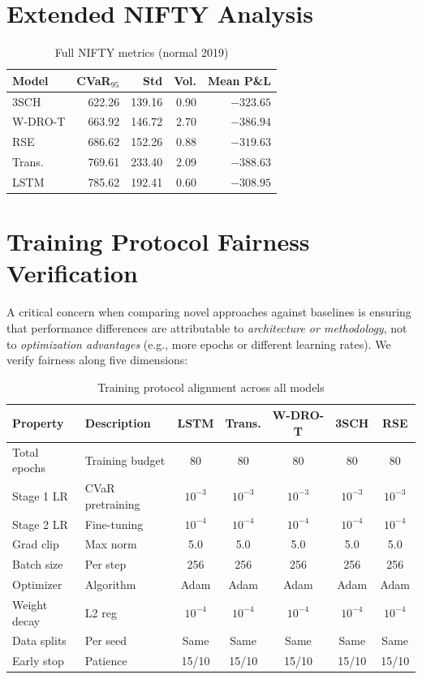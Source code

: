 \documentclass[11pt]{article}
\begin{document}
\section{Extended NIFTY Analysis}
\label{app:nifty}

\begin{table}[h]
\centering
\caption{Full NIFTY metrics (normal 2019)}
\small
\begin{tabular}{lrrrr}
\toprule
\textbf{Model} & \textbf{CVaR$_{95}$} & \textbf{Std} & \textbf{Vol.} & \textbf{Mean P\&L} \\
\midrule
3SCH & 622.26 & 139.16 & 0.90 & $-323.65$ \\
W-DRO-T & 663.92 & 146.72 & 2.70 & $-386.94$ \\
RSE & 686.62 & 152.26 & 0.88 & $-319.63$ \\
Trans. & 769.61 & 233.40 & 2.09 & $-388.63$ \\
LSTM & 785.62 & 192.41 & 0.60 & $-308.95$ \\
\bottomrule
\end{tabular}
\end{table}

\section{Training Protocol Fairness Verification}
\label{app:fairness}

A critical concern when comparing novel approaches against baselines is ensuring that performance differences are attributable to \emph{architecture or methodology}, not to \emph{optimization advantages} (e.g., more epochs or different learning rates).  We verify fairness along five dimensions:

\begin{table}[h]
\centering
\caption{Training protocol alignment across all models}
\small
\begin{tabularx}{\textwidth}{@{}lXccccc@{}}
\toprule
\textbf{Property} & \textbf{Description} & \textbf{LSTM} & \textbf{Trans.} & \textbf{W-DRO-T} & \textbf{3SCH} & \textbf{RSE} \\
\midrule
Total epochs & Training budget & 80 & 80 & 80 & 80 & 80 \\
Stage 1 LR & CVaR pretraining & $10^{-3}$ & $10^{-3}$ & $10^{-3}$ & $10^{-3}$ & $10^{-3}$ \\
Stage 2 LR & Fine-tuning & $10^{-4}$ & $10^{-4}$ & $10^{-4}$ & $10^{-4}$ & $10^{-4}$ \\
Grad clip & Max norm & 5.0 & 5.0 & 5.0 & 5.0 & 5.0 \\
Batch size & Per step & 256 & 256 & 256 & 256 & 256 \\
Optimizer & Algorithm & Adam & Adam & Adam & Adam & Adam \\
Weight decay & L2 reg & $10^{-4}$ & $10^{-4}$ & $10^{-4}$ & $10^{-4}$ & $10^{-4}$ \\
Data splits & Per seed & Same & Same & Same & Same & Same \\
Early stop & Patience & 15/10 & 15/10 & 15/10 & 15/10 & 15/10 \\
\bottomrule
\end{tabularx}
\end{table}
\end{document}

